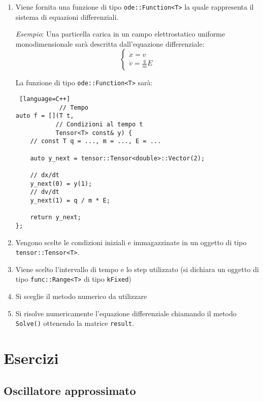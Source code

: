 \begin{enumerate}
	\item Viene fornita una funzione di tipo \texttt{ode::Function<T>} la quale
	      rappresenta il sistema di equazioni differenziali.

	      \textit{Esempio}: Una particella carica in un campo elettrostatico
	      uniforme monodimensionale sarà descritta dall'equazione differenziale:
	      \[
		      \begin{cases}
			      \dot{x} = v \\
			      \dot{v} = \frac{q}{m} E
		      \end{cases}
	      \]

	      La funzione di tipo \texttt{ode::Function<T>} sarà:
	      \begin{lstlisting} [language=C++]
            // Tempo
auto f = [](T t, 
           // Condizioni al tempo t 
           Tensor<T> const& y) {
    // const T q = ..., m = ..., E = ...

    auto y_next = tensor::Tensor<double>::Vector(2);

    // dx/dt
    y_next(0) = y(1);
    // dv/dt 
    y_next(1) = q / m * E;

    return y_next;
};
        \end{lstlisting}

	\item Vengono scelte le condizioni iniziali e immagazzinate in un oggetto di
	      tipo \texttt{tensor::Tensor<T>}.

	\item Viene scelto l'intervallo di tempo e lo step utilizzato (si dichiara
	      un oggetto di tipo \texttt{func::Range<T>} di tipo \texttt{kFixed})

	\item Si sceglie il metodo numerico da utilizzare

	\item Si risolve numericamente l'equazione differenziale chiamando il metodo
	      \texttt{Solve()} ottenendo la matrice \texttt{result}.





\end{enumerate}

\section{Esercizi}

\subsection{Oscillatore approssimato}

